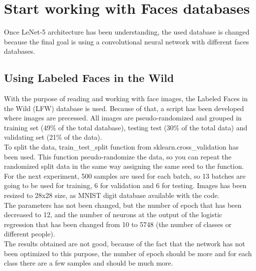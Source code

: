 \clearpage
\section{Start working with Faces databases}
Once LeNet-5 architecture has been understanding, the used database is changed because the final goal is using a convolutional neural network with different faces databases.\\

\subsection{Using Labeled Faces in the Wild}
With the purpose of reading and working with face images, the Labeled Faces in the Wild (LFW) database is used. Because of that, a script has been developed where images are precessed. All images are pseudo-randomized and grouped in training set (49\% of the total database), testing test (30\% of the total data) and validating set (21\% of the data).\\

To split the data, train\_test\_split function from sklearn.cross\_validation has been used. This function pseudo-randomize the data, so you can repeat the randomized split data in the same way assigning the same seed to the function.\\

For the next experiment, 500 samples are used for each batch, so 13 batches are going to be used for training, 6 for validation and 6 for testing. Images has been resized to 28x28 size, as MNIST digit database available with the code. \\

The parameters has not been changed, but the number of epoch that has been decreased to 12, and the number of neurons at the output of the logistic regression that has been changed from 10 to 5748 (the number of classes or different people).\\

The results obtained are not good, because of the fact that the network has not been optimized to this purpose, the number of epoch should be more and for each class there are a few samples and should be much more.\\


